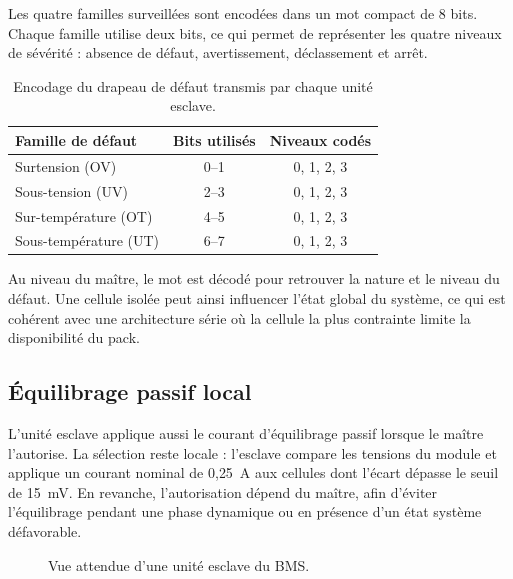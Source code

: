 Les quatre familles surveillées sont encodées dans un mot compact de 8 bits. Chaque famille utilise deux bits, ce qui permet de représenter les quatre niveaux de sévérité : absence de défaut, avertissement, déclassement et arrêt.

\begin{table}[H]
  \centering
  \small
  \begin{tabular}{|l|c|c|}
    \hline
    \textbf{Famille de défaut} & \textbf{Bits utilisés} & \textbf{Niveaux codés} \\
    \hline
    Surtension (OV) & 0--1 & 0, 1, 2, 3 \\
    \hline
    Sous-tension (UV) & 2--3 & 0, 1, 2, 3 \\
    \hline
    Sur-température (OT) & 4--5 & 0, 1, 2, 3 \\
    \hline
    Sous-température (UT) & 6--7 & 0, 1, 2, 3 \\
    \hline
  \end{tabular}
  \captionsetup{width=0.68\textwidth, skip=15pt}
  \caption{Encodage du drapeau de défaut transmis par chaque unité esclave.}
  \label{tab:ch4_fault_flag_encoding}
\end{table}

\noindent
Au niveau du maître, le mot est décodé pour retrouver la nature et le niveau du défaut. Une cellule isolée peut ainsi influencer l'état global du système, ce qui est cohérent avec une architecture série où la cellule la plus contrainte limite la disponibilité du pack.

\subsection{Équilibrage passif local}
\label{subsec:ch4_equilibrage_local}

L'unité esclave applique aussi le courant d'équilibrage passif lorsque le maître l'autorise. La sélection reste locale : l'esclave compare les tensions du module et applique un courant nominal de 0{,}25~A aux cellules dont l'écart dépasse le seuil de 15~mV. En revanche, l'autorisation dépend du maître, afin d'éviter l'équilibrage pendant une phase dynamique ou en présence d'un état système défavorable.

\begin{figure}[H]
  \centering
  \captionsetup{width=0.82\textwidth, skip=15pt}
  \caption{Vue attendue d'une unité esclave du BMS.}
  \label{fig:ch4_placeholder_bms_slave}
\end{figure}

